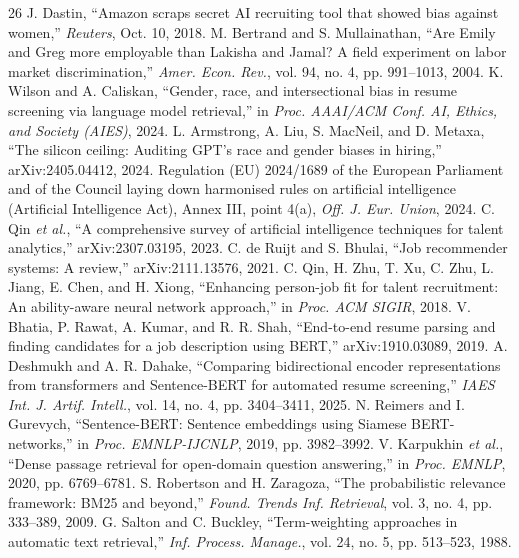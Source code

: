\documentclass[conference]{IEEEtran}
\begin{document}
\begin{thebibliography}{26}
 J. Dastin, ``Amazon scraps secret AI recruiting tool that showed bias against women,'' \textit{Reuters}, Oct. 10, 2018.
 M. Bertrand and S. Mullainathan, ``Are Emily and Greg more employable than Lakisha and Jamal? A field experiment on labor market discrimination,'' \textit{Amer. Econ. Rev.}, vol. 94, no. 4, pp. 991--1013, 2004.
 K. Wilson and A. Caliskan, ``Gender, race, and intersectional bias in resume screening via language model retrieval,'' in \textit{Proc. AAAI/ACM Conf. AI, Ethics, and Society (AIES)}, 2024.
 L. Armstrong, A. Liu, S. MacNeil, and D. Metaxa, ``The silicon ceiling: Auditing GPT's race and gender biases in hiring,'' arXiv:2405.04412, 2024.
 Regulation (EU) 2024/1689 of the European Parliament and of the Council laying down harmonised rules on artificial intelligence (Artificial Intelligence Act), Annex III, point 4(a), \textit{Off. J. Eur. Union}, 2024.
 C. Qin \textit{et al.}, ``A comprehensive survey of artificial intelligence techniques for talent analytics,'' arXiv:2307.03195, 2023.
 C. de Ruijt and S. Bhulai, ``Job recommender systems: A review,'' arXiv:2111.13576, 2021.
 C. Qin, H. Zhu, T. Xu, C. Zhu, L. Jiang, E. Chen, and H. Xiong, ``Enhancing person-job fit for talent recruitment: An ability-aware neural network approach,'' in \textit{Proc. ACM SIGIR}, 2018.
 V. Bhatia, P. Rawat, A. Kumar, and R. R. Shah, ``End-to-end resume parsing and finding candidates for a job description using BERT,'' arXiv:1910.03089, 2019.
 A. Deshmukh and A. R. Dahake, ``Comparing bidirectional encoder representations from transformers and Sentence-BERT for automated resume screening,'' \textit{IAES Int. J. Artif. Intell.}, vol. 14, no. 4, pp. 3404--3411, 2025.
 N. Reimers and I. Gurevych, ``Sentence-BERT: Sentence embeddings using Siamese BERT-networks,'' in \textit{Proc. EMNLP-IJCNLP}, 2019, pp. 3982--3992.
 V. Karpukhin \textit{et al.}, ``Dense passage retrieval for open-domain question answering,'' in \textit{Proc. EMNLP}, 2020, pp. 6769--6781.
 S. Robertson and H. Zaragoza, ``The probabilistic relevance framework: BM25 and beyond,'' \textit{Found. Trends Inf. Retrieval}, vol. 3, no. 4, pp. 333--389, 2009.
 G. Salton and C. Buckley, ``Term-weighting approaches in automatic text retrieval,'' \textit{Inf. Process. Manage.}, vol. 24, no. 5, pp. 513--523, 1988.

\end{thebibliography}
\end{document}
